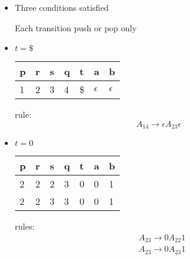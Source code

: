 \begin{frame}[allowframebreaks]
\begin{itemize}
\begin{center}
\end{center}
  
\item Three conditions satisfied

Each transition push or pop only
\item $t=\$$

  \begin{center}
  \begin{tabular}{lllllll}
p & r & s & q & t & a & b\\ \hline
1 & 2 & 3 & 4 & \$ & $\epsilon$ & $\epsilon$
  \end{tabular}
\end{center}
rule:
\begin{equation*}
A_{14} \rightarrow \epsilon A_{23}\epsilon
\end{equation*}
\item $t = 0$

  \begin{center}
  \begin{tabular}{lllllll}
p & r & s & q & t & a & b\\ \hline
2 & 2 & 2 & 3 & 0 & 0 & 1\\
2 & 2 & 3 & 3 & 0 & 0 & 1\\
  \end{tabular}
\end{center}

rules:
\begin{equation*}
  \begin{split}
& A_{23} \rightarrow 0 A_{22} 1 \\
& A_{23} \rightarrow 0 A_{23} 1
\end{split}
\end{equation*}


\end{itemize}
\end{frame}
